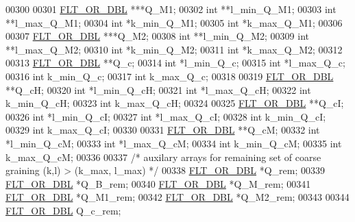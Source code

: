 \begin{DoxyCode}
00300 
00301   \hyperlink{group__data__structures_ga31125aeace516926bf7f251f759b6126}{FLT\_OR\_DBL} ***Q\_M1;
00302   \textcolor{keywordtype}{int} **l\_min\_Q\_M1;
00303   \textcolor{keywordtype}{int} **l\_max\_Q\_M1;
00304   \textcolor{keywordtype}{int} *k\_min\_Q\_M1;
00305   \textcolor{keywordtype}{int} *k\_max\_Q\_M1;
00306 
00307   \hyperlink{group__data__structures_ga31125aeace516926bf7f251f759b6126}{FLT\_OR\_DBL} ***Q\_M2;
00308   \textcolor{keywordtype}{int} **l\_min\_Q\_M2;
00309   \textcolor{keywordtype}{int} **l\_max\_Q\_M2;
00310   \textcolor{keywordtype}{int} *k\_min\_Q\_M2;
00311   \textcolor{keywordtype}{int} *k\_max\_Q\_M2;
00312 
00313   \hyperlink{group__data__structures_ga31125aeace516926bf7f251f759b6126}{FLT\_OR\_DBL} **Q\_c;
00314   \textcolor{keywordtype}{int} *l\_min\_Q\_c;
00315   \textcolor{keywordtype}{int} *l\_max\_Q\_c;
00316   \textcolor{keywordtype}{int} k\_min\_Q\_c;
00317   \textcolor{keywordtype}{int} k\_max\_Q\_c;
00318 
00319   \hyperlink{group__data__structures_ga31125aeace516926bf7f251f759b6126}{FLT\_OR\_DBL} **Q\_cH;
00320   \textcolor{keywordtype}{int} *l\_min\_Q\_cH;
00321   \textcolor{keywordtype}{int} *l\_max\_Q\_cH;
00322   \textcolor{keywordtype}{int} k\_min\_Q\_cH;
00323   \textcolor{keywordtype}{int} k\_max\_Q\_cH;
00324 
00325   \hyperlink{group__data__structures_ga31125aeace516926bf7f251f759b6126}{FLT\_OR\_DBL} **Q\_cI;
00326   \textcolor{keywordtype}{int} *l\_min\_Q\_cI;
00327   \textcolor{keywordtype}{int} *l\_max\_Q\_cI;
00328   \textcolor{keywordtype}{int} k\_min\_Q\_cI;
00329   \textcolor{keywordtype}{int} k\_max\_Q\_cI;
00330 
00331   \hyperlink{group__data__structures_ga31125aeace516926bf7f251f759b6126}{FLT\_OR\_DBL} **Q\_cM;
00332   \textcolor{keywordtype}{int} *l\_min\_Q\_cM;
00333   \textcolor{keywordtype}{int} *l\_max\_Q\_cM;
00334   \textcolor{keywordtype}{int} k\_min\_Q\_cM;
00335   \textcolor{keywordtype}{int} k\_max\_Q\_cM;
00336 
00337   \textcolor{comment}{/* auxilary arrays for remaining set of coarse graining (k,l) > (k\_max, l\_max) */}
00338   \hyperlink{group__data__structures_ga31125aeace516926bf7f251f759b6126}{FLT\_OR\_DBL} *Q\_rem;
00339   \hyperlink{group__data__structures_ga31125aeace516926bf7f251f759b6126}{FLT\_OR\_DBL} *Q\_B\_rem;
00340   \hyperlink{group__data__structures_ga31125aeace516926bf7f251f759b6126}{FLT\_OR\_DBL} *Q\_M\_rem;
00341   \hyperlink{group__data__structures_ga31125aeace516926bf7f251f759b6126}{FLT\_OR\_DBL} *Q\_M1\_rem;
00342   \hyperlink{group__data__structures_ga31125aeace516926bf7f251f759b6126}{FLT\_OR\_DBL} *Q\_M2\_rem;
00343 
00344   \hyperlink{group__data__structures_ga31125aeace516926bf7f251f759b6126}{FLT\_OR\_DBL} Q\_c\_rem;

\end{DoxyCode}
